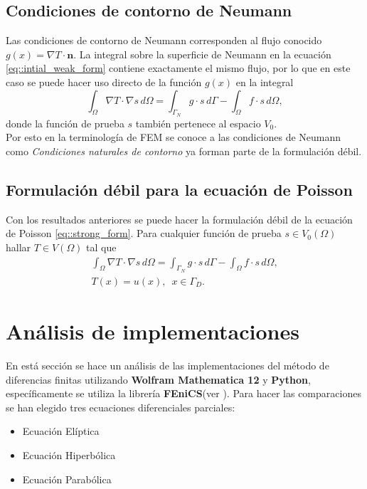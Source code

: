 \documentclass[a4paper]{article}
\begin{document}
\subsection{Condiciones de contorno de Neumann}
Las condiciones de contorno de Neumann corresponden al flujo conocido $g(x)=\nabla T \cdot\mathbf{n}$. La integral sobre la superficie de Neumann en la ecuación \ref{eq::intial_weak_form} contiene exactamente el mismo flujo, por lo que en este caso se puede hacer uso directo de la función $g(x)$ en la integral
\begin{equation}
\int_{\Omega} \nabla T\cdot \nabla s \, d\Omega= \int_{\Gamma_N}g\cdot s \, d\Gamma-\int_{\Omega}f\cdot s\,d\Omega,
\end{equation}
donde la función de prueba $s$ también pertenece al espacio $V_0$.\\
Por esto en la terminología de FEM se conoce a las condiciones de Neumann como \textit{Condiciones naturales de contorno} ya forman parte de la formulación débil.
\subsection{Formulación débil para la ecuación de Poisson}
Con los resultados anteriores se puede hacer la formulación débil de la ecuación de Poisson \ref{eq::strong_form}. Para cualquier función de prueba $s\in V_0(\Omega)$ hallar $T \in V(\Omega)$ tal que 
\begin{equation}
\begin{aligned}\label{eq::Poisson_weak_formulation}
\int_{\Omega} \nabla T\cdot \nabla s \, d\Omega= \int_{\Gamma_N}g\cdot s \, d\Gamma-\int_{\Omega}f\cdot s\,d\Omega,\\
T(x)=u(x),\,\,\,x\in\Gamma_D.
\end{aligned}
\end{equation}
\section{Análisis de implementaciones}
En está sección se hace un análisis de las implementaciones del método de diferencias finitas utilizando \textbf{Wolfram Mathematica 12} y \textbf{Python}, específicamente se utiliza la librería \textbf{FEniCS}(ver \cite{FEniCS}). Para hacer las comparaciones se han elegido tres ecuaciones diferenciales parciales:
\begin{itemize}
\item Ecuación Elíptica
\item Ecuación Hiperbólica
\item Ecuación Parabólica

\end{itemize}
\end{document}
